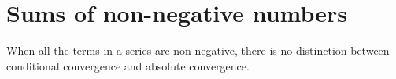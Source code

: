 \section{Sums of non-negative numbers}\label{sec 7.3}

\begin{note}
When all the terms in a series are non-negative, there is no distinction between conditional convergence and absolute convergence.
\end{note}
